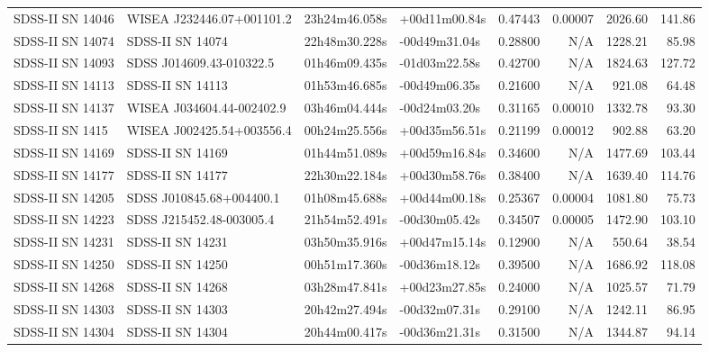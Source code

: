 \begin{longtable}{llllrrrr}
SDSS-II SN 14046 &       WISEA J232446.07+001101.2 &   23h24m46.058s &   +00d11m00.84s &  0.47443 &  0.00007 &  2026.60 &      141.86 \\
SDSS-II SN 14074 &                SDSS-II SN 14074 &   22h48m30.228s &   -00d49m31.04s &  0.28800 &      N/A &  1228.21 &       85.98 \\
SDSS-II SN 14093 &        SDSS J014609.43-010322.5 &   01h46m09.435s &   -01d03m22.58s &  0.42700 &      N/A &  1824.63 &      127.72 \\
SDSS-II SN 14113 &                SDSS-II SN 14113 &   01h53m46.685s &   -00d49m06.35s &  0.21600 &      N/A &   921.08 &       64.48 \\
SDSS-II SN 14137 &       WISEA J034604.44-002402.9 &   03h46m04.444s &   -00d24m03.20s &  0.31165 &  0.00010 &  1332.78 &       93.30 \\
SDSS-II SN 1415  &       WISEA J002425.54+003556.4 &   00h24m25.556s &   +00d35m56.51s &  0.21199 &  0.00012 &   902.88 &       63.20 \\
SDSS-II SN 14169 &                SDSS-II SN 14169 &   01h44m51.089s &   +00d59m16.84s &  0.34600 &      N/A &  1477.69 &      103.44 \\
SDSS-II SN 14177 &                SDSS-II SN 14177 &   22h30m22.184s &   +00d30m58.76s &  0.38400 &      N/A &  1639.40 &      114.76 \\
SDSS-II SN 14205 &        SDSS J010845.68+004400.1 &   01h08m45.688s &   +00d44m00.18s &  0.25367 &  0.00004 &  1081.80 &       75.73 \\
SDSS-II SN 14223 &        SDSS J215452.48-003005.4 &   21h54m52.491s &   -00d30m05.42s &  0.34507 &  0.00005 &  1472.90 &      103.10 \\
SDSS-II SN 14231 &                SDSS-II SN 14231 &   03h50m35.916s &   +00d47m15.14s &  0.12900 &      N/A &   550.64 &       38.54 \\
SDSS-II SN 14250 &                SDSS-II SN 14250 &   00h51m17.360s &   -00d36m18.12s &  0.39500 &      N/A &  1686.92 &      118.08 \\
SDSS-II SN 14268 &                SDSS-II SN 14268 &   03h28m47.841s &   +00d23m27.85s &  0.24000 &      N/A &  1025.57 &       71.79 \\
SDSS-II SN 14303 &                SDSS-II SN 14303 &   20h42m27.494s &   -00d32m07.31s &  0.29100 &      N/A &  1242.11 &       86.95 \\
SDSS-II SN 14304 &                SDSS-II SN 14304 &   20h44m00.417s &   -00d36m21.31s &  0.31500 &      N/A &  1344.87 &       94.14 \\

\end{longtable}
